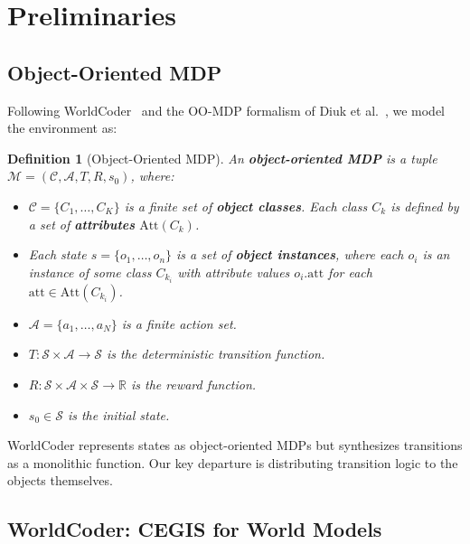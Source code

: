 \documentclass{article}
\newtheorem{definition}{Definition}
\newcommand{\calS}{\mathcal{S}}
\newcommand{\calA}{\mathcal{A}}
\newcommand{\calC}{\mathcal{C}}
\newcommand{\calM}{\mathcal{M}}
\newcommand{\bbR}{\mathbb{R}}
\begin{document}

\section{Preliminaries}
\label{sec:preliminaries}

\subsection{Object-Oriented MDP}
\label{sec:oo_mdp}

Following WorldCoder~\cite{tang2024worldcoder} and the OO-MDP formalism
of Diuk et al.~\cite{diuk2008oomdp}, we model the environment as:

\begin{definition}[Object-Oriented MDP]
\label{def:oomdp}
An \textbf{object-oriented MDP} is a tuple
$\calM = (\calC, \calA, T, R, s_0)$, where:
\begin{itemize}[nosep]
    \item $\calC = \{C_1, \ldots, C_K\}$ is a finite set of \textbf{object
          classes}.  Each class $C_k$ is defined by a set of \textbf{attributes}
          $\text{Att}(C_k)$.
    \item Each state $s = \{o_1, \ldots, o_n\}$ is a set of \textbf{object
          instances}, where each $o_i$ is an instance of some class $C_{k_i}$
          with attribute values $o_i.\text{att}$ for each $\text{att} \in
          \text{Att}(C_{k_i})$.
    \item $\calA = \{a_1, \ldots, a_N\}$ is a finite action set.
    \item $T : \calS \times \calA \to \calS$ is the deterministic transition
          function.
    \item $R : \calS \times \calA \times \calS \to \bbR$ is the reward function.
    \item $s_0 \in \calS$ is the initial state.
\end{itemize}
\end{definition}

WorldCoder represents states as object-oriented MDPs but synthesizes
transitions as a monolithic function.  Our key departure is distributing
transition logic to the objects themselves.

\subsection{WorldCoder: CEGIS for World Models}
\label{sec:worldcoder}
\end{document}
